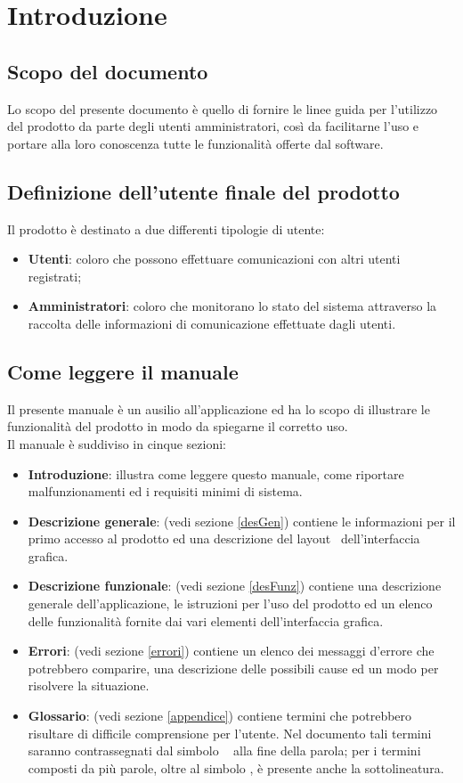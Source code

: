 \section{Introduzione}{

	\subsection{Scopo del documento}{
Lo scopo del presente documento è quello di fornire le linee guida per l’utilizzo del prodotto \textbf{\mytalk} da parte degli utenti amministratori, così da facilitarne l'uso e portare alla loro conoscenza tutte le funzionalità offerte dal software.
	}


\subsection{Definizione dell'utente finale del prodotto}{
Il prodotto è destinato a due differenti tipologie di utente:
\begin{itemize}
	\item[] \textbf{Utenti}: coloro che possono effettuare comunicazioni con altri utenti registrati;
	\item[] \textbf{Amministratori}: coloro che monitorano lo stato del sistema attraverso la raccolta delle informazioni di comunicazione effettuate dagli utenti.
\end{itemize}
	}

\subsection{Come leggere il manuale}{
Il presente manuale è un ausilio all'applicazione ed ha lo scopo di illustrare le funzionalità del prodotto in modo da spiegarne il corretto uso.\\
Il manuale è suddiviso in cinque sezioni:
\begin{itemize}
	\item {\textbf{Introduzione}: illustra come leggere questo manuale, come riportare malfunzionamenti ed i requisiti minimi di sistema.
	}
	\item {\textbf{Descrizione generale}: (vedi sezione \ref{desGen}) contiene le informazioni per il primo accesso al prodotto ed una descrizione del layout\g~ dell'interfaccia grafica.
	}
	\item {\textbf{Descrizione funzionale}: (vedi sezione \ref{desFunz}) contiene una descrizione generale dell'applicazione, le istruzioni per l'uso del prodotto ed un elenco delle funzionalità fornite dai vari elementi dell'interfaccia grafica.
	}
	\item {\textbf{Errori}: (vedi sezione \ref{errori}) contiene un elenco dei messaggi d'errore che potrebbero comparire, una descrizione delle possibili cause ed un modo per risolvere la situazione.
	}
	\item {\textbf{Glossario}: (vedi sezione \ref{appendice}) contiene termini che potrebbero risultare di difficile comprensione per l'utente. Nel documento tali termini saranno contrassegnati dal simbolo \g~ alla fine della parola; per i termini composti da più parole, oltre al simbolo \g, è presente anche la sottolineatura.

}
\end{itemize}}}
